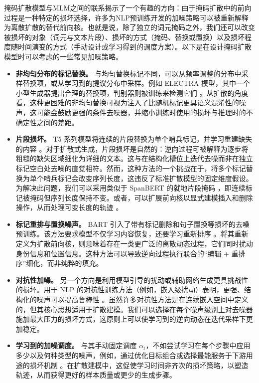 掩码扩散模型与MLM之间的联系揭示了一个有趣的方向：由于掩码扩散中的前向过程是一种特定的损坏选择，许多为NLP预训练开发的加噪策略可以被重新解释为离散扩散的替代前向核。也就是说，除了独立的词元掩码之外，我们还可以改变被损坏的对象（词元与文本片段）、损坏的方式（掩码、替换或置换）以及损坏程度随时间演变的方式（手动设计或学习得到的调度方案）。以下是在设计掩码扩散模型时可以考虑的一些常见加噪策略。

\begin{itemize}
\item \textbf{非均匀分布的标记替换。}
与均匀替换标记不同，可以从频率调整的分布中采样替换项，或从学习到的提议分布中采样。例如 ELECTRA 模型，其中一个小型生成器提出合理的替换项，判别器则被训练来检测它们 \citep{clark-etal:2019electra}。从扩散的角度看，这种更困难的非均匀替换可视为注入了比随机标记更具语义混淆性的噪声，这可能会鼓励更强的条件去噪器，并缩小训练时使用的损坏与推理时的不确定性之间的差距。
\item \textbf{片段损坏。}
T5 系列模型将连续的片段替换为单个哨兵标记，并学习重建缺失的内容 \citep{raffel-etal:2020exploring}。对于扩散式生成，片段损坏是自然的：逆向过程可被解释为逐步将粗糙的缺失区域细化为详细的文本。这与在结构化槽位上迭代去噪而非在独立标记空白处去噪的直觉相符。然而，这种方法的一个挑战在于，将多个标记替换为单个哨兵标记会改变序列长度，这违反了标准扩散模型的固定维度假设。为解决此问题，我们可以采用类似于 SpanBERT 的就地片段掩码 \citep{joshi-etal:2020spanbert}，即连续标记被掩码但序列长度保持不变。或者，可以扩展前向核以显式建模插入和删除操作，从而处理可变长度的轨迹 \citep{gu-etal:2019levenshtein,reid-etal:2022diffuser}。
\item \textbf{标记重排与置换噪声。}
BART 引入了带有标记删除和句子置换等损坏的去噪预训练。该方法要求模型不仅学习内容恢复，还要学习重新排序 \citep{lewis-etal:2020bart}。将其重新定义为扩散前向核，则意味着存在一类更广泛的离散动态过程，它们同时扰动身份信息和位置信息。这种方法可以导致逆向过程执行联合的“编辑 + 重排序”细化，而非纯粹的填充。
\item \textbf{对抗性加噪。}
另一个方向是利用模型引导的扰动或辅助网络生成更具挑战性的损坏。用于 NLP 的对抗性训练方法（例如，嵌入级扰动）表明，更强、结构化的噪声可以提高鲁棒性 \citep{zhu-etal:2020freelb}。虽然许多对抗性方法是在连续嵌入空间中定义的，但其核心思想适用于扩散建模。我们可以选择在每个噪声级别上对去噪器施加最大压力的损坏方式，这原则上可以使学习到的逆向动态在迭代采样下更加稳定。
\item \textbf{学习到的加噪调度。}
与其手动固定调度 $\alpha_t$，不如尝试学习在每个步骤中应用多少以及何种类型的噪声，例如，通过优化目标组合或选择最能服务于下游用途的损坏机制 \citep{tay-etal:2023ul2}。在扩散建模中，这促使学习时间非齐次的损坏策略，以塑造轨迹，从而获得更好的样本质量或更少的生成步骤。
\end{itemize}
